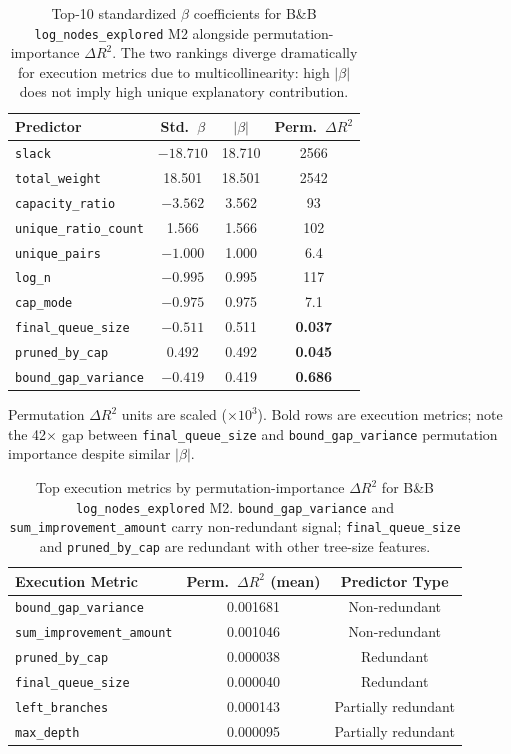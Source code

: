 \documentclass[sigconf]{acmart}
\begin{document}
\begin{table}[t]
\centering
\caption{Top-10 standardized $\beta$ coefficients for B\&B \texttt{log\_nodes\_explored} M2 alongside permutation-importance $\Delta R^2$. The two rankings diverge dramatically for execution metrics due to multicollinearity: high $|\beta|$ does not imply high unique explanatory contribution.}
\label{tab:std_beta}
\begin{tabular}{lccc}
\toprule
\textbf{Predictor} & \textbf{Std.~$\beta$} & \textbf{$|\beta|$} & \textbf{Perm.\ $\Delta R^2$} \\
\midrule
\texttt{slack} & $-18.710$ & 18.710 & 2566 \\
\texttt{total\_weight} & 18.501 & 18.501 & 2542 \\
\texttt{capacity\_ratio} & $-3.562$ & 3.562 & 93 \\
\texttt{unique\_ratio\_count} & 1.566 & 1.566 & 102 \\
\texttt{unique\_pairs} & $-1.000$ & 1.000 & 6.4 \\
\texttt{log\_n} & $-0.995$ & 0.995 & 117 \\
\texttt{cap\_mode} & $-0.975$ & 0.975 & 7.1 \\
\texttt{final\_queue\_size} & $-0.511$ & 0.511 & \textbf{0.037} \\
\texttt{pruned\_by\_cap} & 0.492 & 0.492 & \textbf{0.045} \\
\texttt{bound\_gap\_variance} & $-0.419$ & 0.419 & \textbf{0.686} \\
\bottomrule
\end{tabular}
{\small Permutation $\Delta R^2$ units are scaled ($\times 10^3$). Bold rows are execution metrics; note the 42$\times$ gap between \texttt{final\_queue\_size} and \texttt{bound\_gap\_variance} permutation importance despite similar $|\beta|$.}
\end{table}

\begin{table}[t]
\centering
\caption{Top execution metrics by permutation-importance $\Delta R^2$ for B\&B \texttt{log\_nodes\_explored} M2. \texttt{bound\_gap\_variance} and \texttt{sum\_improvement\_amount} carry non-redundant signal; \texttt{final\_queue\_size} and \texttt{pruned\_by\_cap} are redundant with other tree-size features.}
\label{tab:perm_importance}
\begin{tabular}{lcc}
\toprule
\textbf{Execution Metric} & \textbf{Perm.\ $\Delta R^2$ (mean)} & \textbf{Predictor Type} \\
\midrule
\texttt{bound\_gap\_variance} & 0.001681 & Non-redundant \\
\texttt{sum\_improvement\_amount} & 0.001046 & Non-redundant \\
\texttt{pruned\_by\_cap} & 0.000038 & Redundant \\
\texttt{final\_queue\_size} & 0.000040 & Redundant \\
\texttt{left\_branches} & 0.000143 & Partially redundant \\
\texttt{max\_depth} & 0.000095 & Partially redundant \\
\bottomrule
\end{tabular}
\end{table}
\end{document}
